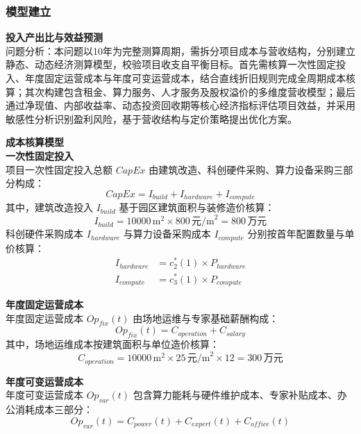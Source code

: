 \documentclass[12pt,a4paper]{article}
\begin{document}
\subsubsection{模型建立}
\textbf{投入产出比与效益预测}\\
问题分析：本问题以10年为完整测算周期，需拆分项目成本与营收结构，分别建立静态、动态经济测算模型，校验项目收支自平衡目标。首先需核算一次性固定投入、年度固定运营成本与年度可变运营成本，结合直线折旧规则完成全周期成本核算；其次构建包含租金、算力服务、人才服务及股权溢价的多维度营收模型；最后通过净现值、内部收益率、动态投资回收期等核心经济指标评估项目效益，并采用敏感性分析识别盈利风险，基于营收结构与定价策略提出优化方案。

\vspace{1em}\textbf{成本核算模型}\\
\vspace{1em}\textbf{一次性固定投入}\\
项目一次性固定投入总额 $CapEx$ 由建筑改造、科创硬件采购、算力设备采购三部分构成：
\begin{equation}
CapEx = I_{build} + I_{hardware} + I_{compute}
\end{equation}
其中，建筑改造投入 $I_{build}$ 基于园区建筑面积与装修造价核算：
\begin{equation}
I_{build} = 10000\,\text{m}^2 \times 800\,\text{元/m}^2 = 800\,\text{万元}
\end{equation}
科创硬件采购成本 $I_{hardware}$ 与算力设备采购成本 $I_{compute}$ 分别按首年配置数量与单价核算：
\begin{align*}
I_{hardware} &= c_2^*(1) \times P_{hardware} \\
I_{compute} &= c_3^*(1) \times P_{compute}
\end{align*}

\textbf{年度固定运营成本}\\
年度固定运营成本 $Op_{fix}(t)$ 由场地运维与专家基础薪酬构成：
\begin{equation}
Op_{fix}(t)=C_{operation}+C_{salary}
\end{equation}
其中，场地运维成本按建筑面积与单位造价核算：
\begin{equation}
C_{operation} = 10000\,\text{m}^2 \times 25\,\text{元/m}^2 \times 12 = 300\,\text{万元}
\end{equation}

\textbf{年度可变运营成本}\\
年度可变运营成本 $Op_{var}(t)$ 包含算力能耗与硬件维护成本、专家补贴成本、办公消耗成本三部分：
\begin{equation}
Op_{var}(t) = C_{power}(t) + C_{expert}(t) + C_{office}(t)
\end{equation}
\end{document}
